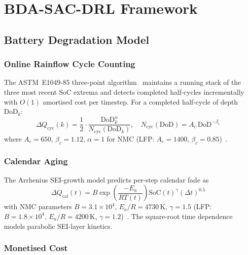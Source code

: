 \documentclass[journal,10pt,twocolumn]{IEEEtran}
\begin{document}
\section{BDA-SAC-DRL Framework}\label{sec:method}

\subsection{Battery Degradation Model}

\subsubsection{Online Rainflow Cycle Counting}

The ASTM~E1049-85 three-point algorithm~\cite{fang_deg_model_2024}
maintains a running stack of the three most recent SoC extrema and
detects completed half-cycles incrementally with $O(1)$ amortised cost
per timestep.
For a completed half-cycle of depth $\mathrm{DoD}_k$:
\begin{equation}
\Delta Q_\mathrm{cyc}(k)=\frac{1}{2}
    \cdot\frac{\mathrm{DoD}_k^{\alpha}}{N_\mathrm{cyc}(\mathrm{DoD}_k)},
\quad N_\mathrm{cyc}(\mathrm{DoD})=A_c\,\mathrm{DoD}^{-\beta_c}
\label{eq:cyc}
\end{equation}
where $A_c=650$, $\beta_c=1.12$, $\alpha=1$ for NMC
(LFP: $A_c=1400$, $\beta_c=0.85$)~\cite{fang_deg_model_2024}.

\subsubsection{Calendar Aging}

The Arrhenius SEI-growth model predicts per-step calendar fade as
\begin{equation}
\Delta Q_\mathrm{cal}(t)=B\exp\!\left(\frac{-E_a}{RT(t)}\right)
    \mathrm{SoC}(t)^{\gamma}(\Delta t)^{0.5}
\label{eq:cal}
\end{equation}
with NMC parameters $B=3.1\times10^4$, $E_a/R=4730\,\mathrm{K}$,
$\gamma=1.5$ (LFP: $B=1.8\times10^4$,
$E_a/R=4200\,\mathrm{K}$, $\gamma=1.2$)~\cite{fang_deg_model_2024}.
The square-root time dependence models parabolic SEI-layer kinetics.

\subsubsection{Monetised Cost}
\end{document}
